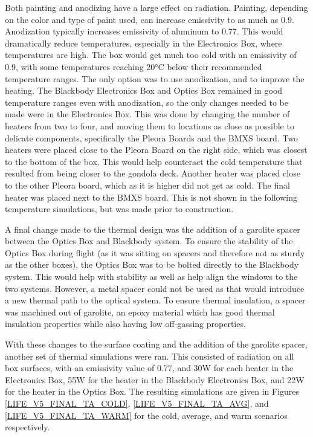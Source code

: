 Both painting and anodizing have a large effect on radiation. Painting, depending on the color and type of paint used, can increase emissivity to as much as 0.9. Anodization typically increases emissivity of aluminum to 0.77. This would dramatically reduce temperatures, especially in the Electronics Box, where temperatures are high. The box would get much too cold with an emissivity of 0.9, with some temperatures reaching 20°C below their recommended temperature ranges. The only option was to use anodization, and to improve the heating. The Blackbody Electronics Box and Optics Box remained in good temperature ranges even with anodization, so the only changes needed to be made were in the Electronics Box. This was done by changing the number of heaters from two to four, and moving them to locations as close as possible to delicate components, specifically the Pleora Boards and the BMXS board. Two heaters were placed close to the Pleora Board on the right side, which was closest to the bottom of the box. This would help counteract the cold temperature that resulted from being closer to the gondola deck. Another heater was placed close to the other Pleora board, which as it is higher did not get as cold. The final heater was placed next to the BMXS board. This is not shown in the following temperature simulations, but was made prior to construction.

A final change made to the thermal design was the addition of a garolite spacer between the Optics Box and Blackbody system. To ensure the stability of the Optics Box during flight (as it was sitting on spacers and therefore not as sturdy as the other boxes), the Optics Box was to be bolted directly to the Blackbody system. This would help with stability as well as help align the windows to the two systems. However, a metal spacer could not be used as that would introduce a new thermal path to the optical system. To ensure thermal insulation, a spacer was machined out of garolite, an epoxy material which has good thermal insulation properties while also having low off-gassing properties.

With these changes to the surface coating and the addition of the garolite spacer, another set of thermal simulations were ran. This consisted of radiation on all box surfaces, with an emissivity value of 0.77, and 30W for each heater in the Electronics Box, 55W for the heater in the Blackbody Electronics Box, and 22W for the heater in the Optics Box. The resulting simulations are given in Figures \ref{LIFE_V5_FINAL_TA_COLD}, \ref{LIFE_V5_FINAL_TA_AVG}, and \ref{LIFE_V5_FINAL_TA_WARM} for the cold, average, and warm scenarios respectively. 

